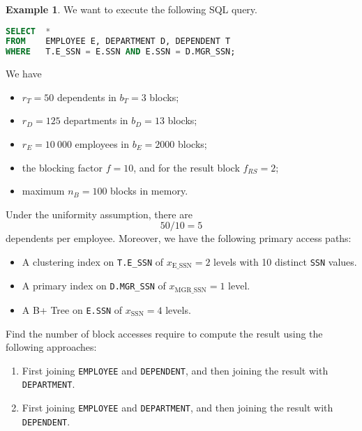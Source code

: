 \documentclass[a4paper, openany]{memoir}
\theoremstyle{definition}
\newtheorem{example}[subsection]{Example}
\begin{document}
\begin{example}
We want to execute the following SQL query.
    \begin{lstlisting}[language=SQL]
SELECT  *
FROM    EMPLOYEE E, DEPARTMENT D, DEPENDENT T
WHERE   T.E_SSN = E.SSN AND E.SSN = D.MGR_SSN;
\end{lstlisting}
    We have
    \begin{itemize}
        \item $r_T = 50$ dependents in $b_T = 3$ blocks;
        \item $r_D = 125$ departments in $b_D = 13$ blocks;
        \item $r_E = 10 \ 000$ employees in $b_E = 2000$ blocks;
        \item the blocking factor $f = 10$, and for the result block $f_{RS} = 2$;
        \item maximum $n_B = 100$ blocks in memory.
    \end{itemize}
    Under the uniformity assumption, there are
    \[50/10 = 5\]
    dependents per employee. Moreover, we have the following primary access paths:
    \begin{itemize}
        \item A clustering index on \texttt{T.E\_SSN} of $x_{\text{E\_SSN}} = 2$ levels with 10 distinct \texttt{SSN} values.
        \item A primary index on \texttt{D.MGR\_SSN} of $x_{\text{MGR\_SSN}} = 1$ level.
        \item A B+ Tree on \texttt{E.SSN} of $x_{\text{SSN}} = 4$ levels.
    \end{itemize}

    Find the number of block accesses require to compute the result using the following approaches:
    \begin{enumerate}
        \item First joining \texttt{EMPLOYEE} and \texttt{DEPENDENT}, and then joining the result with \texttt{DEPARTMENT}.
        \item First joining \texttt{EMPLOYEE} and \texttt{DEPARTMENT}, and then joining the result with \texttt{DEPENDENT}.
    \end{enumerate}
\end{example}
\end{document}
